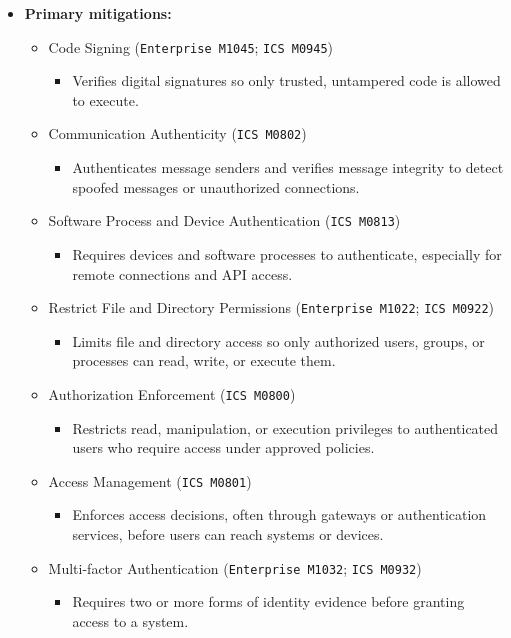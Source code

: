 \documentclass[10pt,a4paper,oneside]{report}
\begin{document}
\begin{itemize}
\item \textbf{Primary mitigations:}
\begin{itemize}
\item Code Signing (\texttt{Enterprise M1045}; \texttt{ICS M0945})
\begin{itemize}
\item Verifies digital signatures so only trusted, untampered code is allowed to execute.
\end{itemize}
\item Communication Authenticity (\texttt{ICS M0802})
\begin{itemize}
\item Authenticates message senders and verifies message integrity to detect spoofed messages or unauthorized connections.
\end{itemize}
\item Software Process and Device Authentication (\texttt{ICS M0813})
\begin{itemize}
\item Requires devices and software processes to authenticate, especially for remote connections and API access.
\end{itemize}
\item Restrict File and Directory Permissions (\texttt{Enterprise M1022}; \texttt{ICS M0922})
\begin{itemize}
\item Limits file and directory access so only authorized users, groups, or processes can read, write, or execute them.
\end{itemize}
\item Authorization Enforcement (\texttt{ICS M0800})
\begin{itemize}
\item Restricts read, manipulation, or execution privileges to authenticated users who require access under approved policies.
\end{itemize}
\item Access Management (\texttt{ICS M0801})
\begin{itemize}
\item Enforces access decisions, often through gateways or authentication services, before users can reach systems or devices.
\end{itemize}
\item Multi-factor Authentication (\texttt{Enterprise M1032}; \texttt{ICS M0932})
\begin{itemize}
\item Requires two or more forms of identity evidence before granting access to a system.
\end{itemize}
\end{itemize}
\end{itemize}
\end{document}

